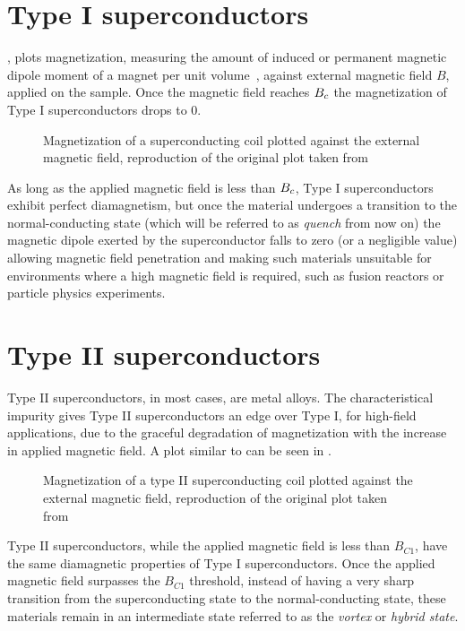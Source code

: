 \section{Type I superconductors}
\label{sec:type1}
, plots magnetization, measuring the amount of induced or
permanent magnetic dipole moment of a magnet per unit volume~\cite{polarization-magnetization},
against external magnetic field $B$, applied on the sample. Once the magnetic field reaches $B_c$ the
magnetization of Type I superconductors drops to $0$.
\begin{figure}[!ht]
	\centering
	
	\caption{Magnetization of a superconducting coil plotted against the external magnetic
		field, reproduction of the original plot taken
		from~\cite{slimani2022superconducting}} \label{fig:type1-transition}
\end{figure}
As long as the applied magnetic field is less than $B_c$, Type I superconductors exhibit perfect
diamagnetism, but once the material undergoes a transition to the normal-conducting
state (which will be referred to as \emph{quench} from now on) the magnetic dipole exerted by the
superconductor falls to zero (or a negligible value) allowing magnetic field penetration and making
such materials unsuitable for environments where a high magnetic field is required, such as fusion
reactors or particle physics experiments.

\section{Type II superconductors}
\label{sec:type2}
Type II superconductors, in most cases, are metal alloys. The characteristical impurity gives Type II superconductors an edge
over Type I, for high-field applications, due to the graceful degradation of magnetization with the increase in applied magnetic
field. A plot similar to  can be seen in .
\begin{figure}[!ht]
	\centering
	
	\caption{Magnetization of a type II superconducting coil plotted against the external
		magnetic field, reproduction of the original plot taken from~\cite{slimani2022superconducting}}
	\label{fig:type2-transition}
\end{figure}

Type II superconductors, while the applied magnetic field is less than $B_{C1}$, have the same
diamagnetic properties of Type I superconductors. Once the applied magnetic field surpasses the
$B_{C1}$ threshold, instead of having a very sharp transition from the superconducting state to
the normal-conducting state, these materials remain in an intermediate state referred to as the \emph{vortex} or \emph{hybrid state}.

